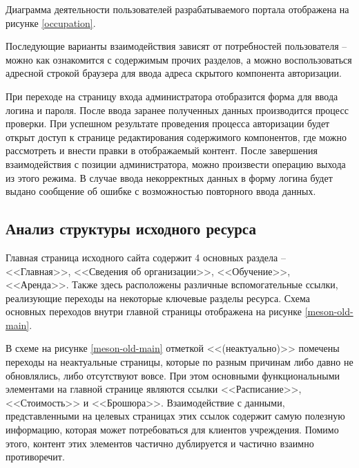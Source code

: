 Диаграмма деятельности пользователей разрабатываемого портала отображена на рисунке \ref{occupation}.


Последующие варианты взаимодействия зависят от потребностей пользователя -- можно как ознакомится с содержимым прочих разделов, а можно воспользоваться адресной строкой браузера для ввода адреса скрытого компонента авторизации.

При переходе на страницу входа администратора отобразится форма для ввода логина и пароля.
После ввода заранее полученных данных производится процесс проверки.
При успешном результате проведения процесса авторизации будет открыт доступ к странице редактирования содержимого компонентов, где можно рассмотреть и внести правки в отображаемый контент.
После завершения взаимодействия с позиции администратора, можно произвести операцию выхода из этого режима.
В случае ввода некорректных данных в форму логина будет выдано сообщение об ошибке с возможностью повторного ввода данных.


\subsection{Анализ структуры исходного ресурса}\label{Анализ структуры исходного ресурса}

Главная страница исходного сайта содержит 4 основных раздела -- <<Главная>>, <<Сведения об организации>>, <<Обучение>>, <<Аренда>>.
Также здесь расположены различные вспомогательные ссылки, реализующие переходы на некоторые ключевые разделы ресурса.
Схема основных переходов внутри главной страницы отображена на рисунке \ref{meson-old-main}.


В схеме на рисунке \ref{meson-old-main} отметкой <<(неактуально)>> помечены переходы на неактуальные страницы, которые по разным причинам либо давно не обновлялись, либо отсутствуют вовсе.
При этом основными функциональными элементами на главной странице являются ссылки <<Расписание>>, <<Стоимость>> и <<Брошюра>>.
Взаимодействие с данными, представленными на целевых страницах этих ссылок содержит самую полезную информацию, которая может потребоваться для клиентов учреждения.
Помимо этого, контент этих элементов частично дублируется и частично взаимно противоречит.


